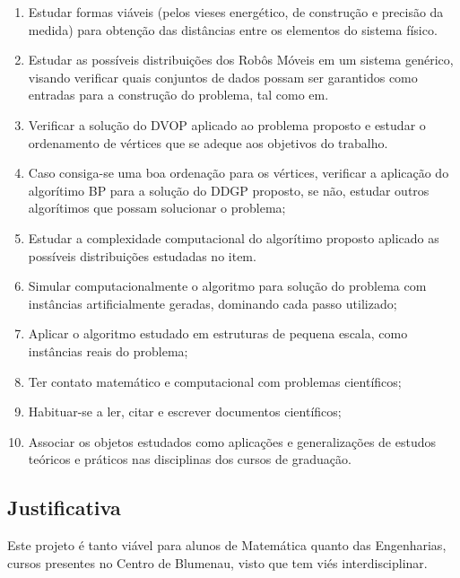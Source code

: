 \documentclass[11pt]{article}
\begin{document}
\begin{enumerate}[(1)]

\item Estudar formas viáveis (pelos vieses energético, de construção e precisão da medida) para obtenção das distâncias entre os elementos do sistema físico.

\item Estudar as possíveis distribuições dos Robôs Móveis em um sistema genérico, visando verificar quais conjuntos de dados possam ser garantidos como entradas para a construção do problema, tal como em.

\item Verificar a solução do DVOP aplicado ao problema proposto e estudar o ordenamento de vértices que se adeque aos objetivos do trabalho.

\item Caso consiga-se uma boa ordenação para os vértices, verificar a aplicação do algorítimo BP para a solução do DDGP proposto, se não, estudar outros algorítimos que possam solucionar o problema;

\item Estudar a complexidade computacional do algorítimo proposto aplicado as possíveis distribuições estudadas no item.

\item Simular computacionalmente o algoritmo para solução do problema com instâncias artificialmente geradas, dominando cada passo utilizado;

\item Aplicar o algoritmo estudado em estruturas de pequena escala, como instâncias reais do problema;

\item Ter contato matemático e computacional com problemas científicos;

\item Habituar-se a ler, citar e escrever documentos científicos;

\item Associar os objetos estudados como aplicações e generalizações de estudos teóricos e práticos nas disciplinas dos cursos de graduação.
\end{enumerate}


\subsection{Justificativa}

Este projeto é tanto viável para alunos de Matemática quanto das Engenharias, cursos presentes no Centro de Blumenau, visto que tem viés interdisciplinar.
\end{document}
